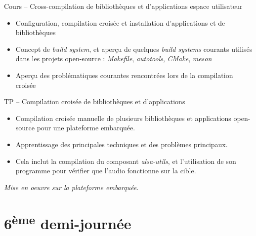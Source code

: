 \documentclass[a4paper,12pt,obeyspaces,spaces,hyphens]{article}
\begin{document}
\feagendatwocolumn
{Cours – Cross-compilation de bibliothèques et d'applications espace utilisateur}
{
  \begin{itemize}
  \item Configuration, compilation croisée et installation
    d'applications et de bibliothèques
  \item Concept de {\em build system}, et aperçu de quelques {\em
      build systems} courants utilisés dans les projets open-source :
    {\em Makefile}, {\em autotools}, {\em CMake}, {\em meson}
  \item Aperçu des problématiques courantes rencontrées lors de la
    compilation croisée
  \end{itemize}
}
{TP – Compilation croisée de bibliothèques et d'applications}
{
  \begin{itemize}
  \item Compilation croisée manuelle de plusieurs bibliothèques et
    applications open-source pour une plateforme embarquée.
  \item Apprentissage des principales techniques et des problèmes
    principaux.
  \item Cela inclut la compilation du composant {\em alsa-utils},
     et l'utilisation de son programme  pour
     vérifier que l'audio fonctionne sur la cible.
  \end{itemize}

  \vspace{0.5cm}
  {\em Mise en oeuvre sur la plateforme embarquée.}
}

\section{6\textsuperscript{ème} demi-journée}
\end{document}
